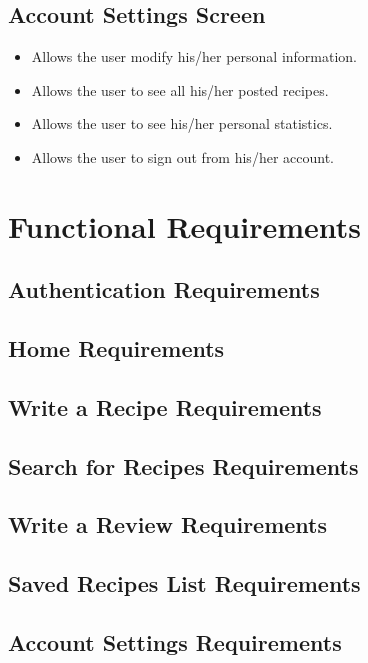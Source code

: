 	\subsection{Account Settings Screen}
		\begin{itemize}
			\item Allows the user modify his/her personal information.
			
			\item Allows the user to see all his/her posted recipes.
			
			\item Allows the user to see his/her personal statistics.
			
			\item Allows the user to sign out from his/her account.
		\end{itemize}


\section{Functional Requirements}
	\subsection{Authentication Requirements}

	\subsection{Home Requirements}

	\subsection{Write a Recipe Requirements}

	\subsection{Search for Recipes Requirements}

	\subsection{Write a Review Requirements}

	\subsection{Saved Recipes List Requirements}

	\subsection{Account Settings Requirements}


